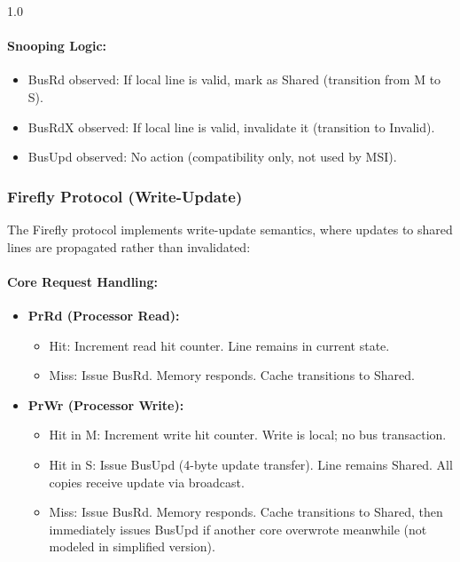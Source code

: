 \documentclass[12pt]{article}
\begin{document}
\begin{spacing}{1.0}
\paragraph{Snooping Logic:}

\begin{itemize}
    \item BusRd observed: If local line is valid, mark as Shared (transition from M to S).
    \item BusRdX observed: If local line is valid, invalidate it (transition to Invalid).
    \item BusUpd observed: No action (compatibility only, not used by MSI).
\end{itemize}

\subsubsection{Firefly Protocol (Write-Update)}

The Firefly protocol implements write-update semantics, where updates to shared lines are propagated rather than invalidated:

\paragraph{Core Request Handling:}

\begin{itemize}
    \item \textbf{PrRd (Processor Read):}
    \begin{itemize}
        \item Hit: Increment read hit counter. Line remains in current state.
        \item Miss: Issue BusRd. Memory responds. Cache transitions to Shared.
    \end{itemize}
    
    \item \textbf{PrWr (Processor Write):}
    \begin{itemize}
        \item Hit in M: Increment write hit counter. Write is local; no bus transaction.
        \item Hit in S: Issue BusUpd (4-byte update transfer). Line remains Shared. All copies receive update via broadcast.
        \item Miss: Issue BusRd. Memory responds. Cache transitions to Shared, then immediately issues BusUpd if another core overwrote meanwhile (not modeled in simplified version).
    \end{itemize}
\end{itemize}


\end{spacing}
\end{document}
